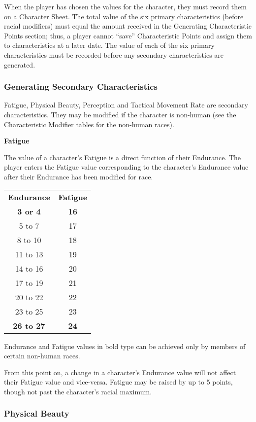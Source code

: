 \begin{multicols*}{3}
When the player has chosen the values for the character, they must
record them on a Character Sheet. The total value of the six primary
characteristics (before racial modifiers) must equal the amount
received in the Generating Characteristic Points section; thus, a
player cannot ``save'' Characteristic Points and assign them to
characteristics at a later date. The value of each of the six primary
characteristics must be recorded before any secondary characteristics
are generated.

\subsubsection{Generating Secondary Characteristics}

Fatigue, Physical Beauty, Perception and Tactical Movement Rate are
secondary characteristics. They may be modified if the character is
non-human (see the Characteristic Modifier tables for the non-human
races).

\textbf{Fatigue}

The value of a character's Fatigue is a direct function of their
Endurance. The player enters the Fatigue value corresponding to the
character's Endurance value after their Endurance has been modified
for race.


\begin{tabular}{cc}
\textbf{Endurance} & \textbf{Fatigue} \\
\textbf{3 or 4}	& \textbf{16} \\
 5 to 7		& 17 \\
 8 to 10	& 18 \\
11 to 13	& 19 \\ 
14 to 16	& 20 \\
17 to 19	& 21 \\
20 to 22	& 22 \\
23 to 25	& 23 \\
\textbf{26 to 27} & \textbf{24} \\
\end{tabular}

Endurance and Fatigue values in bold type can be achieved only by
members of certain non-human races.

From this point on, a change in a character's Endurance value will not
affect their Fatigue value and vice-versa. Fatigue may be raised by up
to 5 points, though not past the character's racial maximum.

\subsubsection{Physical Beauty}


\end{multicols*}
